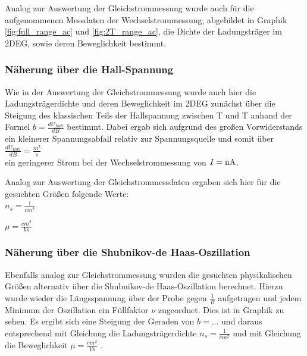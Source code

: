 

Analog zur Auswertung der Gleichstrommessung wurde auch für die aufgenommenen Messdaten der Wechselstrommessung, abgebildet in Graphik \ref{fig:full_range_ac} und \ref{fig:2T_range_ac}, die Dichte der Ladungsträger im 2DEG, sowie deren Beweglichkeit bestimmt.

\subsubsection{Näherung über die Hall-Spannung}
\label{ch:naeherung_hall2}

Wie in der Auswertung der Gleichstrommessung wurde auch hier die Ladungsträgerdichte und deren Beweglichkeit im 2DEG zunächst über die Steigung des klassischen Teils der Hallspannung zwischen \unit[-2]{T} und \unit[2]{T} anhand der Formel $b=\frac{dU_{Hall}}{dB}$  
bestimmt. Dabei ergab sich aufgrund des großen Vorwiderstands ein kleinerer Spannungsabfall relativ zur Spannungsquelle und somit über 
\\
$\frac{dU_{Hall}}{dB}=  \frac{m^2}{s}$  %
\\
ein geringerer Strom bei der Wechselstrommessung von $I=\unit[]{nA}$. %

Analog zur Auswertung der Gleichstrommessdaten ergaben sich hier für die gesuchten Größen folgende Werte: \\

$n_s= \frac{1}{cm^2}$  %


$\mu= \frac{cm^2}{Vs}$  %


\subsubsection{Näherung über die Shubnikov-de Haas-Oszillation}
\label{ch:naeherung_ac}

Ebenfalls analog zur Gleichstrommessung wurden die gesuchten physikalischen Größen alternativ über die Shubnikov-de Haas-Oszillation berechnet. Hierzu wurde wieder die Längsspannung über der Probe 
gegen $\frac{1}{B}$ aufgetragen und jedem Minimum der Oszillation ein Füllfaktor $\nu$ zugeordnet. Dies ist in Graphik %
zu sehen. 
Es ergibt sich eine Steigung der Geraden von $b=...$  %
und daraus entsprechend mit Gleichung %
die Ladungsträgerdichte $n_s= \frac{1}{cm^2}$  %
und mit Gleichung %
die Beweglichkeit          
$\mu= \frac{cm^2}{Vs}$ . %




